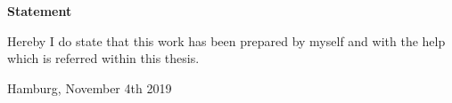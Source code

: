 \begin{center}
{\Huge \bf Statement}
\label{sec:statement}
\end{center}
Hereby I do state that this work has been prepared by myself and with the help which is referred within
this thesis.


\vspace{2cm}

Hamburg, November 4th 2019

